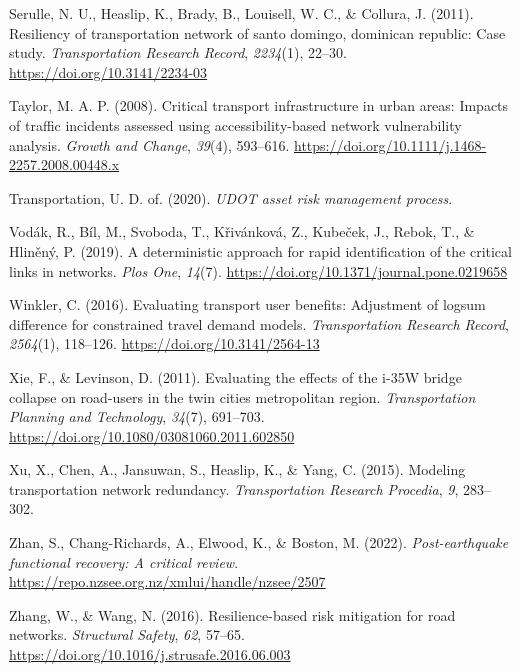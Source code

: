 \documentclass[
  letterpaper,
  number,
  review,
  3p]{elsarticle}
\newlength{\cslhangindent}
\newlength{\cslentryspacingunit} %
\newenvironment{CSLReferences}[2] %
 {%
  \setlength{\parindent}{0pt}
  \ifodd #1
  \let\oldpar\par
  \def\par{\hangindent=\cslhangindent\oldpar}
  \fi
  \setlength{\parskip}{#2\cslentryspacingunit}
 }%
 {}
\begin{document}
\begin{CSLReferences}{1}{0}
\leavevmode{}%
Serulle, N. U., Heaslip, K., Brady, B., Louisell, W. C., \& Collura, J.
(2011). Resiliency of transportation network of santo domingo, dominican
republic: Case study. \emph{Transportation Research Record},
\emph{2234}(1), 22--30. \url{https://doi.org/10.3141/2234-03}

\leavevmode{}%
Taylor, M. A. P. (2008). Critical transport infrastructure in urban
areas: Impacts of traffic incidents assessed using accessibility-based
network vulnerability analysis. \emph{Growth and Change}, \emph{39}(4),
593--616. \url{https://doi.org/10.1111/j.1468-2257.2008.00448.x}

\leavevmode{}%
Transportation, U. D. of. (2020). \emph{UDOT asset risk management
process}.

\leavevmode{}%
Vodák, R., Bíl, M., Svoboda, T., Křivánková, Z., Kubeček, J., Rebok, T.,
\& Hliněný, P. (2019). A deterministic approach for rapid identification
of the critical links in networks. \emph{Plos One}, \emph{14}(7).
\url{https://doi.org/10.1371/journal.pone.0219658}

\leavevmode{}%
Winkler, C. (2016). Evaluating transport user benefits: Adjustment of
logsum difference for constrained travel demand models.
\emph{Transportation Research Record}, \emph{2564}(1), 118--126.
\url{https://doi.org/10.3141/2564-13}

\leavevmode{}%
Xie, F., \& Levinson, D. (2011). Evaluating the effects of the i-35W
bridge collapse on road-users in the twin cities metropolitan region.
\emph{Transportation Planning and Technology}, \emph{34}(7), 691--703.
\url{https://doi.org/10.1080/03081060.2011.602850}

\leavevmode{}%
Xu, X., Chen, A., Jansuwan, S., Heaslip, K., \& Yang, C. (2015).
Modeling transportation network redundancy. \emph{Transportation
Research Procedia}, \emph{9}, 283--302.

\leavevmode{}%
Zhan, S., Chang-Richards, A., Elwood, K., \& Boston, M. (2022).
\emph{Post-earthquake functional recovery: A critical review}.
\url{https://repo.nzsee.org.nz/xmlui/handle/nzsee/2507}

\leavevmode{}%
Zhang, W., \& Wang, N. (2016). Resilience-based risk mitigation for road
networks. \emph{Structural Safety}, \emph{62}, 57--65.
\url{https://doi.org/10.1016/j.strusafe.2016.06.003}


\end{CSLReferences}
\end{document}
